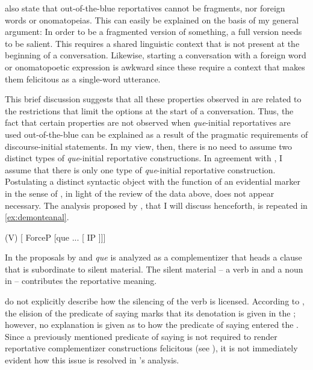 \citet{DemonteSoriano2014} also state  that out-of-the-blue reportatives cannot be fragments, nor foreign words or onomatopeias. This can easily be explained on the basis of my general argument: In order to be a fragmented version of something, a full version needs to be salient. This requires a shared linguistic context that is not present at the beginning of a conversation. Likewise, starting a conversation with a foreign word or onomatopoetic  expression is awkward since these require a context that makes them felicitous as a single-word utterance.

This brief discussion suggests that   all these properties observed in \citet{DemonteSoriano2014} are related  to the restrictions that limit the options at the start of a conversation.  Thus, the fact that certain properties are not observed when \emph{que}-initial reportatives are used out-of-the-blue  can be explained as a result of the  pragmatic requirements of discourse-initial statements. In my view, then, there is no need to assume two distinct types of \emph{que}-initial reportative constructions.  In agreement with \citet{Corr2016}, I assume that there is only one type of \emph{que}-initial reportative construction. Postulating a  distinct syntactic object with the function of an evidential marker in the sense of \citet{DemonteSoriano2014}, in light of the review of the data above, does not appear necessary. The  analysis proposed by \citet[39: ex 53]{DemonteSoriano2014}, that I will discuss henceforth,  is repeated in \eqref{ex:demonteanal}.

\ea\label{ex:demonteanal} (V) [ ForceP [que ... [ IP ]]]
\z

In the proposals by \citet{Etxepare2013} and \citet{DemonteSoriano2014} \emph{que} is analyzed as a  complementizer that heads a clause that is subordinate to silent material. The silent material -- a verb in \citet{DemonteSoriano2014} and a noun in \citet{Etxepare2013} -- contributes the reportative meaning. 

\citet{DemonteSoriano2014} do not explicitly describe   how the silencing of the verb is licensed. According to \citet{Etxepare2013}, the elision of the predicate of saying marks that its denotation is given in the ; however, no explanation is given as to how the predicate of saying entered the . Since a previously mentioned predicate of saying  is not required to render reportative complementizer constructions felicitous   (see ), it is not immediately evident how this issue is resolved in \citeauthor{Etxepare2013}'s analysis.






